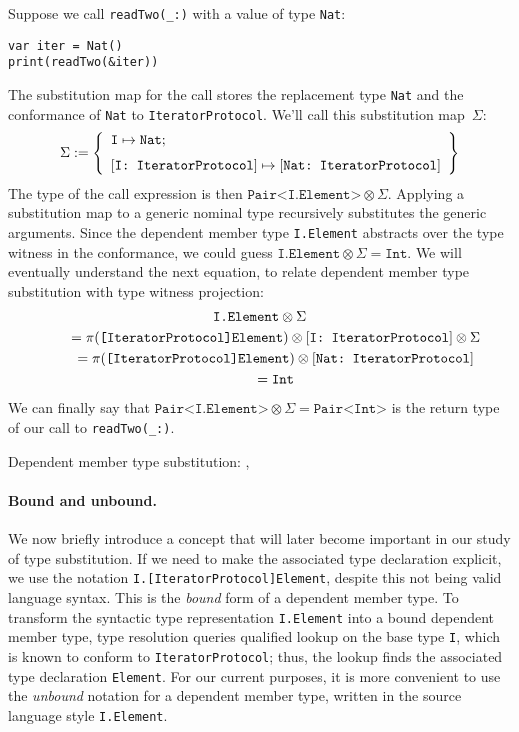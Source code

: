 \documentclass[../generics]{subfiles}
\begin{document}
Suppose we call \verb|readTwo(_:)| with a value of type \texttt{Nat}:
\begin{Verbatim}
var iter = Nat()
print(readTwo(&iter))
\end{Verbatim}
The substitution map for the call stores the replacement type \texttt{Nat} and the conformance of \texttt{Nat} to \texttt{IteratorProtocol}. We'll call this substitution map~$\Sigma$:
\[\Sigma := \SubstMapLongC{\SubstType{I}{Nat}}{\SubstConf{I}{Nat}{IteratorProtocol}}\]
The type of the call expression is then $\texttt{Pair<I.Element>}\otimes\Sigma$. Applying a substitution map to a generic nominal type recursively substitutes the generic arguments. Since the dependent member type \texttt{I.Element} abstracts over the type witness in the conformance, we could guess $\texttt{I.Element}\otimes\Sigma=\texttt{Int}$. We will eventually understand the next equation, to relate dependent member type substitution with type witness projection:
\begin{gather*}
\texttt{I.Element}\otimes\Sigma\\
\qquad {} = \pi(\texttt{[IteratorProtocol]Element})\otimes [\texttt{I:~IteratorProtocol}]\otimes\Sigma\\
\qquad {} = \pi(\texttt{[IteratorProtocol]Element})\otimes [\texttt{Nat:~IteratorProtocol}]\\
\qquad {} = \texttt{Int}
\end{gather*}
We can finally say that $\texttt{Pair<I.Element>}\otimes\Sigma=\texttt{Pair<Int>}$ is the return type of our call to \verb|readTwo(_:)|.

\begin{MoreDetails}
\item Dependent member type substitution: , 
\end{MoreDetails}

\paragraph{Bound and unbound.}
We now briefly introduce a concept that will later become important in our study of type substitution. If we need to make the associated type declaration explicit, we use the notation \verb|I.[IteratorProtocol]Element|, despite this not being valid language syntax. This is the \emph{bound} form of a dependent member type. To transform the syntactic type representation \texttt{I.Element} into a bound dependent member type, type resolution queries qualified lookup on the base type \texttt{I}, which is known to conform to \texttt{IteratorProtocol}; thus, the lookup finds the associated type declaration \texttt{Element}. For our current purposes, it is more convenient to use the \emph{unbound} notation for a dependent member type, written in the source language style \texttt{I.Element}.
\end{document}
